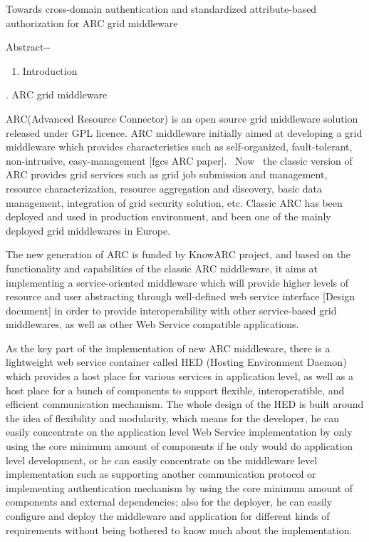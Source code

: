 \documentclass{article}
\title{}
\newcommand\liststyleLi{%
\renewcommand\theenumi{\arabic{enumi}}
\renewcommand\theenumii{\arabic{enumii}}
\renewcommand\theenumiii{\arabic{enumiii}}
\renewcommand\theenumiv{\arabic{enumiv}}
\renewcommand\labelenumi{\theenumi.}
\renewcommand\labelenumii{\theenumii.}
\renewcommand\labelenumiii{\theenumiii.}
\renewcommand\labelenumiv{\theenumiv.}
}
\begin{document}
{\centering
Towards cross-domain authentication and standardized attribute-based
authorization for ARC grid middleware
\par}


\bigskip

Abstract-{}-


\bigskip


\bigskip


\bigskip

\liststyleLi
\begin{enumerate}
\item {\centering
Introduction
\par}


\bigskip
\end{enumerate}

\bigskip


\bigskip

{. ARC grid middleware 
\par}

ARC(Advanced Resource Connector) is an open source grid middleware
solution released under GPL licence. ARC middleware initially aimed at
developing a grid middleware which provides characteristics such as
self-organized, fault-tolerant, non-intrusive, easy-management [fgcs
ARC paper]. \ Now \ the classic version of ARC provides grid services
such as grid job submission and management, resource characterization,
resource aggregation and discovery, basic data management, integration
of grid security solution, etc. Classic ARC has been deployed and used
in production environment, and been one of the mainly deployed grid
middlewares in Europe.

The new generation of ARC is funded by KnowARC project, and based on the
functionality and capabilities of the classic ARC middleware, it aims
at implementing a service-oriented middleware which will provide higher
levels of resource and user abstracting through well-defined web
service interface [Design document] in order to provide
interoperability with other service-based grid middlewares, as well as
other Web Service compatible applications.

As the key part of the implementation of new ARC middleware, there is a
lightweight web service container called HED (Hosting Environment
Daemon) which provides a host place for various services in application
level, as well as a host place for a bunch of components to support
flexible, interoperatible, and efficient communication mechanism. The
whole design of the HED is built around the idea of flexibility and
modularity, which means for the developer, he can easily concentrate on
the application level Web Service implementation by only using the core
minimum amount of components if he only would do application level
development, or he can easily concentrate on the middleware level
implementation such as supporting another communication protocol or
implementing authentication mechanism by using the core minimum amount
of components and external dependencies; also for the deployer, he can
easily configure and deploy the middleware and application for
different kinds of requirements without being bothered to know much
about the implementation.
\end{document}

